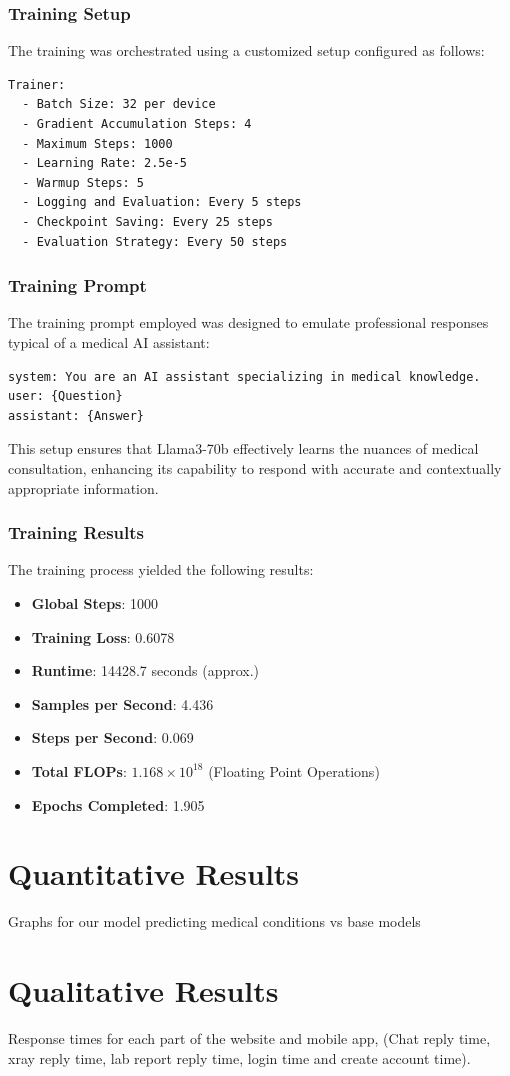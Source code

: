 \subsubsection{Training Setup}
The training was orchestrated using a customized setup configured as follows:
\begin{verbatim}
Trainer:
  - Batch Size: 32 per device
  - Gradient Accumulation Steps: 4
  - Maximum Steps: 1000
  - Learning Rate: 2.5e-5
  - Warmup Steps: 5
  - Logging and Evaluation: Every 5 steps
  - Checkpoint Saving: Every 25 steps
  - Evaluation Strategy: Every 50 steps
\end{verbatim}

\subsubsection{Training Prompt}
The training prompt employed was designed to emulate professional responses typical of a medical AI assistant:
\begin{verbatim}
system: You are an AI assistant specializing in medical knowledge.
user: {Question}
assistant: {Answer}
\end{verbatim}

This setup ensures that Llama3-70b effectively learns the nuances of medical consultation, enhancing its capability to respond with accurate and contextually appropriate information.

\subsubsection{Training Results}
The training process yielded the following results:
\begin{itemize}
    \item \textbf{Global Steps}: 1000
    \item \textbf{Training Loss}: 0.6078
    \item \textbf{Runtime}: 14428.7 seconds (approx.)
    \item \textbf{Samples per Second}: 4.436
    \item \textbf{Steps per Second}: 0.069
    \item \textbf{Total FLOPs}: \(1.168 \times 10^{18}\) (Floating Point Operations)
    \item \textbf{Epochs Completed}: 1.905
\end{itemize}


\section{Quantitative Results}
Graphs for our model predicting medical conditions vs base models
\section{Qualitative Results}
Response times for each part of the website and mobile app, (Chat reply time, xray reply time, lab report reply time, login time and create account time).

